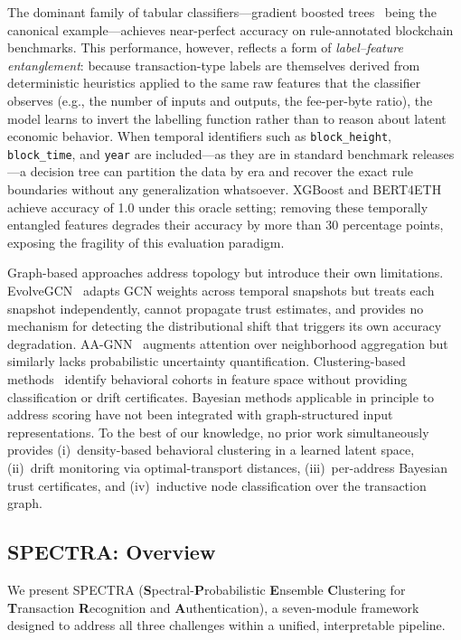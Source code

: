 \documentclass[journal]{IEEEtran}
\begin{document}
The dominant family of tabular classifiers---gradient boosted
trees~\cite{Chen2016} being the canonical example---achieves near-perfect
accuracy on rule-annotated blockchain benchmarks.
This performance, however, reflects a form of \emph{label--feature
entanglement}: because transaction-type labels are themselves derived from
deterministic heuristics applied to the same raw features that the classifier
observes (e.g., the number of inputs and outputs, the fee-per-byte ratio),
the model learns to invert the labelling function rather than to reason about
latent economic behavior.
When temporal identifiers such as \texttt{block\_height}, \texttt{block\_time},
and \texttt{year} are included---as they are in standard benchmark releases
---a decision tree can partition the data by era and recover the exact rule
boundaries without any generalization whatsoever.
XGBoost and BERT4ETH~\cite{Hu2023} achieve accuracy of \num{1.0} under
this oracle setting; removing these temporally entangled features degrades
their accuracy by more than \num{30} percentage points, exposing the
fragility of this evaluation paradigm.

Graph-based approaches address topology but introduce their own limitations.
EvolveGCN~\cite{Pareja2020} adapts GCN weights across temporal snapshots
but treats each snapshot independently, cannot propagate trust estimates,
and provides no mechanism for detecting the distributional shift that triggers
its own accuracy degradation.
AA-GNN~\cite{Zhou2020} augments attention over neighborhood aggregation but
similarly lacks probabilistic uncertainty quantification.
Clustering-based methods~\cite{McInnes2017} identify behavioral cohorts in
feature space without providing classification or drift certificates.
Bayesian methods applicable in principle to address scoring
\cite{DeFord2019} have not been integrated with graph-structured input
representations.
To the best of our knowledge, no prior work simultaneously provides
(i)~density-based behavioral clustering in a learned latent space,
(ii)~drift monitoring via optimal-transport distances,
(iii)~per-address Bayesian trust certificates, and
(iv)~inductive node classification over the transaction graph.

\subsection*{SPECTRA: Overview}

We present \textsc{SPECTRA}
(\textbf{S}pectral-\textbf{P}robabilistic \textbf{E}nsemble \textbf{C}lustering
for \textbf{T}ransaction \textbf{R}ecognition and \textbf{A}uthentication),
a seven-module framework designed to address all three challenges within a
unified, interpretable pipeline.
\end{document}
